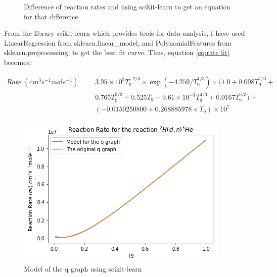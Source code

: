 \documentclass[11pt]{article}
\numberwithin{equation}{section}
\begin{document}
\begin{figure}[H]
	\centering
	\caption{Difference of reaction rates and using scikit-learn to get an equation for that difference}
	\label{difference}
\end{figure}

From the library scikit-learn \cite{scikit-learn} which provides tools for data analysis, I have used LinearRegression from sklearn.linear\_model, and PolynomialFeatures from sklearn.preprocessing, to get the best fit curve. Thus, equation \ref{eq:rate fit} becomes:

\begin{align}
	Rate\;(cm^{3} s^{-1} mole^{-1}) =\; &3.95\times 10^{8} T_{9}^{-2/3}\times \exp(-4.259/T_{9}^{1/3})\times (1.0 + 0.098T_{9}^{1/3} + \nonumber \\
	&0.765T_{9}^{2/3} + 0.525T_{9}+ 9.61\times 10^{-3}T_{9}^{4/3} + 0.0167T_{9}^{5/3}) + \nonumber \\
	&(-0.0150250800 + 0.268885978\times T_{9})\times 10^{7} \label{eq:model for rate}
\end{align}

\begin{figure}[H]
  \centering
  \includegraphics[width=0.7\linewidth]{"./Figures/model of q.png"}
  \caption{Model of the q graph using scikit-learn}
  \label{fig:model of q}
\end{figure}
\end{document}
